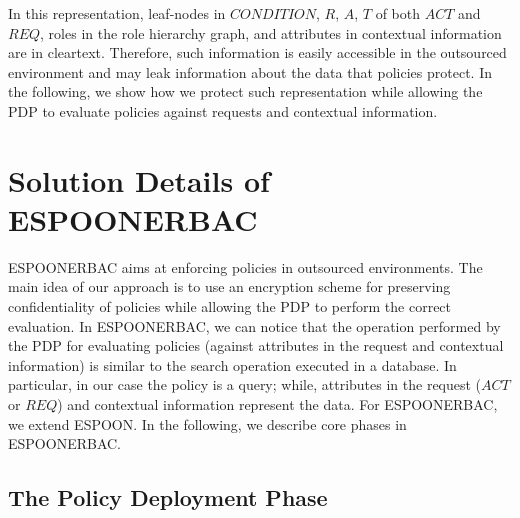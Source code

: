 \documentclass[epsfig,a4paper,11pt,titlepage]{book}
\numberwithin{algorithm}{chapter}
\begin{document}
In this representation, leaf-nodes in $\mathit{CONDITION}$, $R$, $A$, $T$ of both $\mathit{ACT}$ and $\mathit{REQ}$, roles in the role hierarchy graph, and attributes in contextual information are in cleartext. Therefore, such information is easily accessible in the outsourced environment and may leak information about the data that policies protect. In the following, we show how we protect such representation while allowing the \gls{PDP} to evaluate policies against requests and contextual information.

\section[Solution Details of ESPOON$_{\mathit{ERBAC}}$]{Solution Details of \gls{ESPOONERBAC}}
\label{sec:erbac-solution-details}

\gls{ESPOONERBAC} aims at enforcing policies in outsourced environments. The main idea of our approach is to use an encryption scheme for preserving confidentiality of policies while allowing the \gls{PDP} to perform the correct evaluation. In \gls{ESPOONERBAC}, we can notice that the operation performed by the \gls{PDP} for evaluating policies (against attributes in the request and contextual information) is similar to the search operation executed in a database. In particular, in our case the policy is a query; while, attributes in the request ($\mathit{ACT}$ or $\mathit{REQ}$) and contextual information represent the data. For \gls{ESPOONERBAC}, we extend \gls{ESPOON}. In the following, we describe core phases in \gls{ESPOONERBAC}.

\subsection{The Policy Deployment Phase}
\end{document}
